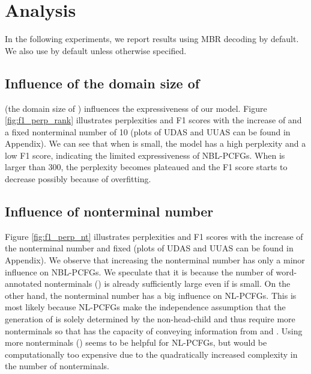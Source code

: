 \documentclass[11pt,a4paper]{article}
\begin{document}
\section{Analysis}
  In the following experiments, we report results using MBR decoding by default. We also use  by default unless otherwise specified.

\subsection{Influence of the domain size of }
\label{sec:inf_h}
 (the domain size of ) influences the expressiveness of our model. Figure \ref{fig:f1_perp_rank} illustrates perplexities and F1 scores with the increase of  and a fixed nonterminal number of 10 (plots of UDAS and UUAS can be found in Appendix).  We can see that when  is small, the model has a high perplexity and a low F1 score, indicating the limited expressiveness of NBL-PCFGs. When  is larger than 300, the perplexity becomes plateaued and the F1 score starts to decrease possibly because of overfitting.


\subsection{Influence of nonterminal number}
\label{sec:inf_nt}
Figure \ref{fig:f1_perp_nt} illustrates perplexities and F1 scores with the increase of the nonterminal number and fixed  (plots of UDAS and UUAS can be found in Appendix). We observe that increasing the nonterminal number has only a minor influence on NBL-PCFGs. We speculate that it is because the number of word-annotated nonterminals () is already sufficiently large even if  is small. On the other hand, the nonterminal number has a big influence on NL-PCFGs. This is most likely because NL-PCFGs make the independence assumption that the generation of  is solely determined by the non-head-child  and thus require more nonterminals so that  has the capacity of conveying information from  and .
Using more nonterminals () seems to be helpful for NL-PCFGs, but would be computationally too expensive due to the quadratically increased complexity in the number of nonterminals.

 
\end{document}
